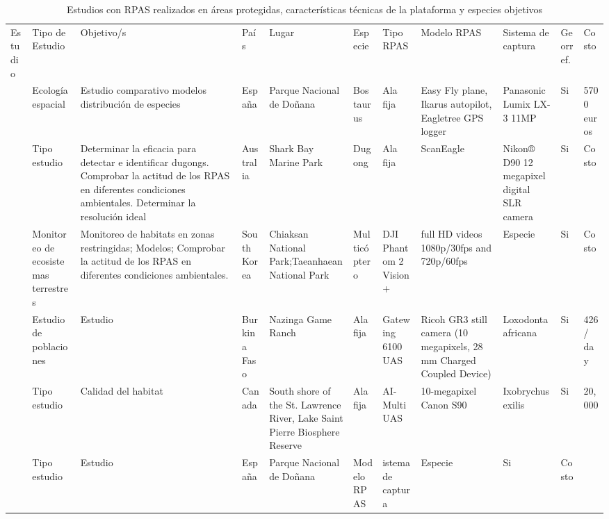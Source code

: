 \documentclass[11pt,]{article}
\begin{document}
\begin{sidewaystable}
\centering
\captionsetup{font=scriptsize,labelfont=scriptsize}
\caption{Estudios con RPAS realizados en áreas protegidas, características técnicas de la plataforma y especies objetivos}
\label{my-label}
\tiny
\begin{tabular}{p{2.5cm}p{1cm}p{3cm}p{1cm}p{2cm}p{2cm}p{1cm}p{2cm}p{2cm}p{1cm}p{0.5cm}}
\cmidrule(r){1-11}

Estudio & Tipo de Estudio & Objetivo/s & País & Lugar & Especie & Tipo RPAS & Modelo RPAS & Sistema de captura & Georref. & Costo \\ \cmidrule(r){1-11}

\cite{PazmanyMulero2015}  & Ecología espacial & Estudio comparativo modelos distribución de especies & España & Parque Nacional de Doñana & Bos taurus  & Ala fija & Easy Fly plane, Ikarus autopilot, Eagletree GPS logger & Panasonic Lumix LX-3 11MP & Si & 5700 euros \\ 

\citealt{Hodgson2013} & Tipo estudio & Determinar la eficacia para detectar e identificar dugongs.  Comprobar la actitud de los RPAS en diferentes condiciones ambientales. Determinar la resolución ideal  & Australia & Shark Bay Marine Park & Dugong & Ala fija &  ScanEagle & Nikon® D90 12 megapixel digital SLR camera  & Si & Costo  \\ 

\cite{Ivosevic2015}  & Monitoreo de ecosistemas terrestres & Monitoreo de habitats en zonas restringidas; Modelos; Comprobar la actitud de los RPAS en diferentes condiciones ambientales. & South Korea & Chiaksan National Park;Taeanhaean National Park & Multicóptero & DJI Phantom 2 Vision+ & full HD videos  1080p/30fps and 720p/60fps & Especie & Si & Costo \\ 

\cite{Vermeulen2013}  & Estudio de poblaciones & Estudio &  Burkina Faso & Nazinga Game Ranch & Ala fija  &  Gatewing 6100 UAS & Ricoh GR3 still camera (10 megapixels, 28 mm Charged Coupled Device) & Loxodonta africana & Si & 426 / day \\ 
\cite{Chabot2014}  & Tipo estudio & Calidad del habitat & Canada & South shore of the St. Lawrence River, Lake Saint Pierre Biosphere Reserve  & Ala fija  &  AI-Multi UAS & 10-megapixel Canon S90 & Ixobrychus exilis & Si & 20,000  \\ 
\cite{PazmanyMulero2015}  & Tipo estudio & Estudio & España & Parque Nacional de Doñana & Modelo RPAS  & istema de captura & Especie & Si & Costo  \\ 


\end{tabular}
\end{sidewaystable}
\end{document}
